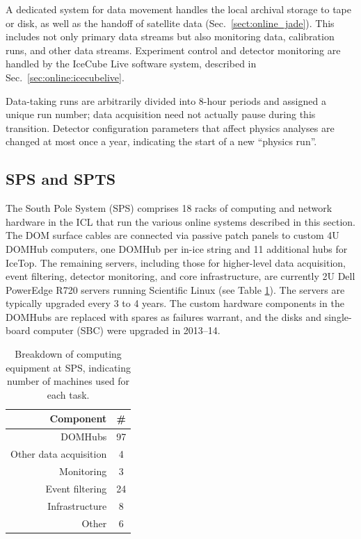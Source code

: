 A dedicated system for data movement handles the local archival storage to
tape or disk, as well as the handoff of satellite data
(Sec.~\ref{sect:online_jade}).  This includes not only primary data streams
but also monitoring data, calibration runs, and other data streams.
Experiment control and detector monitoring are handled by the IceCube Live
software system, described in Sec.~\ref{sec:online:icecubelive}.

Data-taking runs are arbitrarily divided into 8-hour periods and assigned
a unique run number; data acquisition need not actually pause during
this transition.  Detector configuration parameters that affect physics
analyses are changed at most once a year, indicating the start of a new
``physics run''.   

\subsection{\label{sect:sps}SPS and SPTS}

The South Pole System (SPS) comprises 18 racks of computing and network
hardware in the ICL that run the various online systems described in this
section.  The DOM surface cables are connected via passive patch panels to
custom 4U DOMHub computers, one DOMHub per in-ice string and 11 additional
hubs for IceTop.  The remaining servers, including those for higher-level
data acquisition, event filtering, detector monitoring, and core
infrastructure, are currently 2U Dell PowerEdge R720 servers running
Scientific Linux (see Table \ref{tab:sps_breakdown}).  The servers are
typically upgraded every 3 to 4 years.  The custom hardware components in
the DOMHubs are replaced with spares as failures warrant, and the disks and
single-board computer (SBC) were upgraded in 2013--14.

\begin{table}[h]
  \centering
  \begin{tabular}{ r | c }
    \bf{Component} & \bf{\#} \\ \hline DOMHubs & 97 \\ Other data
    acquisition & 4 \\
    Monitoring & 3 \\ Event filtering & 24 \\ Infrastructure & 8 \\ Other &
    6 \\
  \end{tabular}
  \caption{Breakdown of computing equipment at SPS, indicating number of
    machines used for each task.}
  \label{tab:sps_breakdown}
\end{table}

